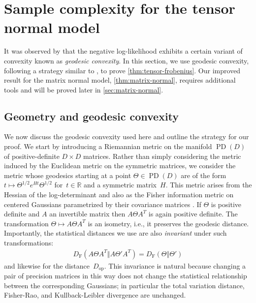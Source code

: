 \documentclass[aos]{imsart}
\theoremstyle{definition}
\numberwithin{equation}{section}
\DeclareMathOperator{\PD}{PD}
\DeclarePairedDelimiter{\norm}{\lVert}{\rVert}
\newcommand{\R}{{\mathbb{R}}}
\newcommand{\DF}{D_{\operatorname{F}}}
\newcommand{\Dop}{D_{\operatorname{op}}}
\begin{document}
\section{Sample complexity for the tensor normal model}\label{sec:tensor-normal}
It was observed by \cite{wiesel2012geodesic} that the negative log-likelihood exhibits a certain variant of convexity known as \emph{geodesic convexity}.
In this section, we use geodesic convexity, following a strategy similar to \cite{FM20}, to prove \cref{thm:tensor-frobenius}.
Our improved result for the matrix normal model, \cref{thm:matrix-normal}, requires additional tools and will
be proved later in \cref{sec:matrix-normal}.

\subsection{Geometry and geodesic convexity}\label{subsec:geom}
We now discuss the geodesic convexity used here and outline the strategy for our proof.
We start by introducing a Riemannian metric on the manifold $\PD(D)$ of positive-definite $D\times D$ matrices.
Rather than simply considering the metric induced by the Euclidean metric on the symmetric matrices, we consider the metric whose geodesics starting at a point $\Theta \in \PD(D)$ are of the form $t \mapsto \Theta^{1/2} e^{Ht} \Theta^{1/2}$ for~$t \in \R$ and a symmetric matrix~$H$. %
This metric arises from the Hessian of the log-determinant \citep{bhatia2009positive} and also as the Fisher information metric on centered Gaussians parametrized by their covariance matrices \citep{skovgaard1984riemannian}.
If $\Theta$ is positive definite and $A$ an invertible matrix then $A\Theta A^T$ is again  positive definite.
The transformation $\Theta \mapsto A\Theta A^T$ is an isometry, i.e., it preserves the geodesic distance.
Importantly, the statistical distances we use are also \emph{invariant} under such transformations:
\begin{align*}
  \DF(A \Theta A^T \Vert A \Theta' A^T) = \DF(\Theta \Vert \Theta')
\end{align*}
and likewise for the distance~$\Dop$.
This invariance is natural because changing a pair of precision matrices in this way does not change the statistical relationship between the corresponding Gaussians; in particular the total variation distance, Fisher-Rao, and Kullback-Leibler divergence are unchanged.
\end{document}
